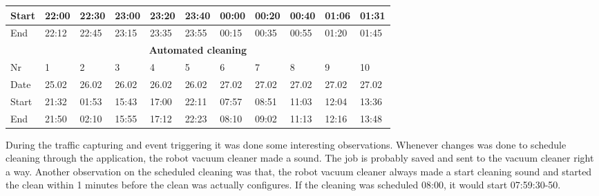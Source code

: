 \begin{table}[H]
\begin{tabular}{|lllllllllll|}
\multicolumn{1}{|l|}{Start}  & \multicolumn{1}{l|}{22:00} & \multicolumn{1}{l|}{22:30} & \multicolumn{1}{l|}{23:00} & \multicolumn{1}{l|}{23:20} & \multicolumn{1}{l|}{23:40} & \multicolumn{1}{l|}{00:00} & \multicolumn{1}{l|}{00:20} & \multicolumn{1}{l|}{00:40} & \multicolumn{1}{l|}{01:06} & 01:31 \\ \hline
\multicolumn{1}{|l|}{End}    & \multicolumn{1}{l|}{22:12} & \multicolumn{1}{l|}{22:45} & \multicolumn{1}{l|}{23:15} & \multicolumn{1}{l|}{23:35} & \multicolumn{1}{l|}{23:55} & \multicolumn{1}{l|}{00:15} & \multicolumn{1}{l|}{00:35} & \multicolumn{1}{l|}{00:55} & \multicolumn{1}{l|}{01:20} & 01:45 \\ \hline
\multicolumn{11}{|c|}{\textbf{Automated cleaning}}                                                                                                                                                                                                                                                        \\ \hline
\multicolumn{1}{|l|}{Nr} & \multicolumn{1}{l|}{1}     & \multicolumn{1}{l|}{2}     & \multicolumn{1}{l|}{3}     & \multicolumn{1}{l|}{4}     & \multicolumn{1}{l|}{5}     & \multicolumn{1}{l|}{6}     & \multicolumn{1}{l|}{7}     & \multicolumn{1}{l|}{8}     & \multicolumn{1}{l|}{9}     & 10    \\ \hline
\multicolumn{1}{|l|}{Date}   & \multicolumn{1}{l|}{25.02} & \multicolumn{1}{l|}{26.02} & \multicolumn{1}{l|}{26.02} & \multicolumn{1}{l|}{26.02} & \multicolumn{1}{l|}{26.02} & \multicolumn{1}{l|}{27.02} & \multicolumn{1}{l|}{27.02} & \multicolumn{1}{l|}{27.02} & \multicolumn{1}{l|}{27.02} & 27.02 \\ \hline
\multicolumn{1}{|l|}{Start}  & \multicolumn{1}{l|}{21:32} & \multicolumn{1}{l|}{01:53} & \multicolumn{1}{l|}{15:43} & \multicolumn{1}{l|}{17:00} & \multicolumn{1}{l|}{22:11} & \multicolumn{1}{l|}{07:57} & \multicolumn{1}{l|}{08:51} & \multicolumn{1}{l|}{11:03} & \multicolumn{1}{l|}{12:04} & 13:36 \\ \hline
\multicolumn{1}{|l|}{End}    & \multicolumn{1}{l|}{21:50} & \multicolumn{1}{l|}{02:10} & \multicolumn{1}{l|}{15:55} & \multicolumn{1}{l|}{17:12} & \multicolumn{1}{l|}{22:23} & \multicolumn{1}{l|}{08:10} & \multicolumn{1}{l|}{09:02} & \multicolumn{1}{l|}{11:13} & \multicolumn{1}{l|}{12:16} & 13:48 \\ \hline
\end{tabular}
\end{table}

During the traffic capturing and event triggering it was done some interesting observations. Whenever changes was done to schedule cleaning through the application, the robot vacuum cleaner made a sound. The job is probably saved and sent to the vacuum cleaner right a way. Another observation on the scheduled cleaning was that, the robot vacuum cleaner always made a start cleaning sound and started the clean within 1 minutes before the clean was actually configures. If the cleaning was scheduled 08:00, it would start 07:59:30-50.

